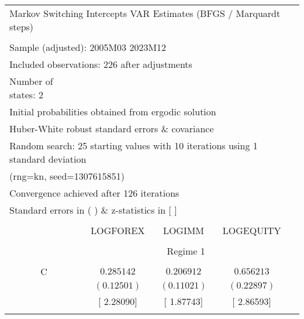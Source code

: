 \begin{tabular}{lrrrr}
\multicolumn{5}{l}{Markov Switching Intercepts VAR Estimates (BFGS / Marquardt steps)}\\
{}&\multicolumn{1}{c}{}\\
\multicolumn{3}{l}{Sample (adjusted): 2005M03 2023M12}&\multicolumn{1}{c}{}&\multicolumn{1}{c}{}\\
\multicolumn{3}{l}{Included observations: 226 after adjustments}&\multicolumn{1}{c}{}&\multicolumn{1}{c}{}\\
\multicolumn{1}{l}{Number of states: 2}&\multicolumn{1}{c}{}&\multicolumn{1}{c}{}&\multicolumn{1}{c}{}&\multicolumn{1}{c}{}\\
\multicolumn{4}{l}{Initial probabilities obtained from ergodic solution}&\multicolumn{1}{c}{}\\
\multicolumn{4}{l}{Huber-White robust standard errors \& covariance}&\multicolumn{1}{c}{}\\
\multicolumn{6}{l}{Random search: 25 starting values with 10 iterations using 1 standard deviation}\\
\multicolumn{2}{l}{(rng=kn, seed=1307615851)}&\multicolumn{1}{c}{}&\multicolumn{1}{c}{}&\multicolumn{1}{c}{}\\
\multicolumn{3}{l}{Convergence achieved after 126 iterations}&\multicolumn{1}{c}{}&\multicolumn{1}{c}{}\\
\multicolumn{3}{l}{Standard errors in ( ) \& z-statistics in [ ]}&\multicolumn{1}{c}{}&\multicolumn{1}{c}{}\\
[4.5pt] \hline \\ [-4.5pt]
\multicolumn{1}{c}{}&\multicolumn{1}{c}{LOGFOREX}&\multicolumn{1}{c}{LOGIMM}&\multicolumn{1}{c}{LOGEQUITY}&\multicolumn{1}{c}{}\\
[4.5pt] \hline \\ [-4.5pt]
\multicolumn{1}{c}{}&\multicolumn{3}{c}{Regime 1}&\multicolumn{1}{c}{}\\
[4.5pt] \hline \\ [-4.5pt]
\multicolumn{1}{c}{C}&\multicolumn{1}{c}{$0.285142$}&\multicolumn{1}{c}{$0.206912$}&\multicolumn{1}{c}{$0.656213$}&\multicolumn{1}{c}{}\\
\multicolumn{1}{c}{}&\multicolumn{1}{c}{$(0.12501)$}&\multicolumn{1}{c}{$(0.11021)$}&\multicolumn{1}{c}{$(0.22897)$}&\multicolumn{1}{c}{}\\
\multicolumn{1}{c}{}&\multicolumn{1}{c}{[ 2.28090]}&\multicolumn{1}{c}{[ 1.87743]}&\multicolumn{1}{c}{[ 2.86593]}&\multicolumn{1}{c}{}\\
\multicolumn{1}{c}{}&\multicolumn{1}{c}{}&\multicolumn{1}{c}{}&\multicolumn{1}{c}{}&\multicolumn{1}{c}{}\\

\end{tabular}
